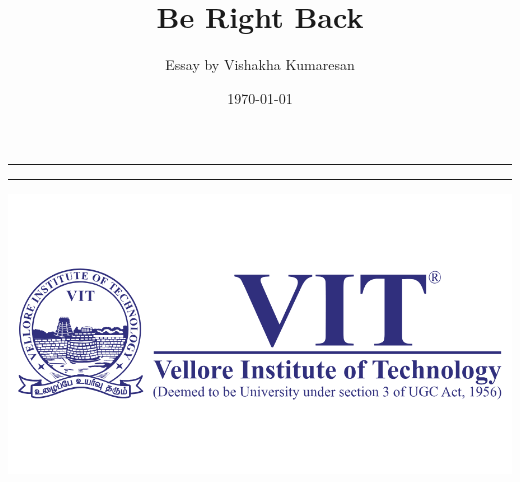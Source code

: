 \documentclass{article}
\title{Be Right Back}
\author{Essay by Vishakha Kumaresan}
\date{\today}
\begin{document}
\maketitle											%
\vspace{-112px}										%
\noindent\rule{\linewidth}{1pt} \par				%
\vspace{100px}										%
\vspace{-20px}										%
\noindent\rule{\linewidth}{1pt} \par				%
\vspace{10px}										%
\vspace{-85px}										%
\noindent											%
\begin{minipage}{0.5\textwidth}\begin{flushleft}	%
\hspace{20px}										%
\includegraphics[scale = 0.06]{vitlogo}		%
\end{flushleft}\end{minipage}						%
\end{document}
